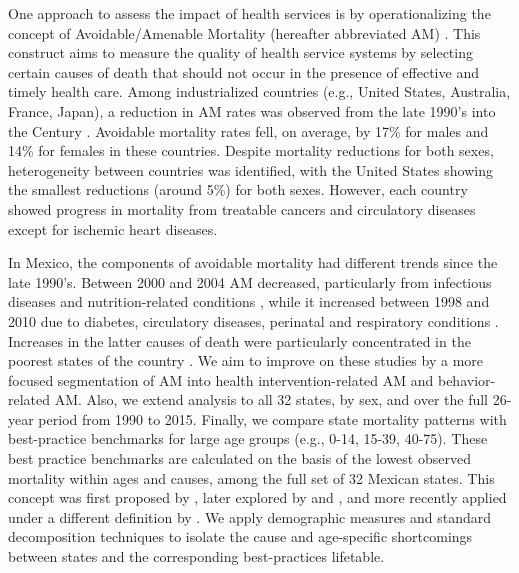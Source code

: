 \documentclass{article}
\begin{document}
\begin{spacing}{1.5}
 One approach to assess the impact of health services is by operationalizing the
 concept of Avoidable/Amenable Mortality (hereafter abbreviated AM)
 \citep{nolte&mckee2004, nolte&mckee2008}. This construct aims to measure the quality of health service systems by selecting certain
 causes of death that should not occur in the presence of effective and
 timely health care. Among industrialized countries (e.g., United States,
 Australia, France, Japan), a reduction in AM rates was
 observed from the late 1990's into the  Century
 \citep{nolte&mckee2008}. Avoidable mortality rates fell, on average, by 17\%
 for males and 14\% for females in these countries. Despite mortality reductions for
 both sexes, heterogeneity between countries was identified, with the United
 States showing the smallest reductions (around 5\%) for both sexes. However,
 each country showed progress in mortality from treatable cancers and
 circulatory diseases except for ischemic heart diseases.

In Mexico, the components of avoidable mortality had different trends since the
late 1990's. Between 2000 and 2004 AM decreased, particularly from
infectious diseases and nutrition-related conditions \citep{francomarina2006}, while it increased between 1998 and 2010 due to diabetes, circulatory diseases, perinatal and respiratory conditions
\citep{agudelo2014efecto}. Increases in the latter causes
of death were particularly concentrated in the poorest states of the country
\citep{davila2014mortalidad}. We aim to improve on these studies
by a more focused segmentation of AM into health intervention-related AM and
behavior-related AM. Also, we extend analysis to all 32 states, by sex, and over
the full 26-year period from 1990 to 2015. Finally, we compare state mortality patterns
with best-practice benchmarks for large age groups (e.g., 0-14, 15-39, 40-75). These best practice
benchmarks are calculated on the basis of the lowest observed mortality within
ages and causes, among the full set of 32 Mexican states. This concept was first
proposed by \citet{whelpton1947}, later explored by  \citet{wunsch1975minimum} and
\citet{vallin2008minimum}, and more recently applied under a different
definition by \citet{eikemo2014}. We apply demographic measures and
standard decomposition techniques to isolate the cause and age-specific shortcomings between states and the corresponding best-practices lifetable. 


\end{spacing}
\end{document}
